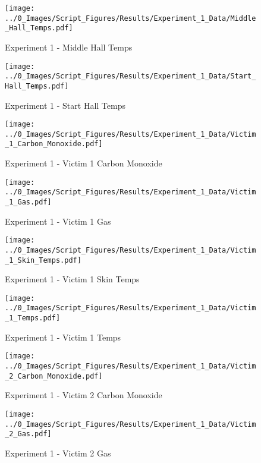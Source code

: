 	\begin{figure}[H]
		\centering
		\texttt{[image: ../0\_Images/Script\_Figures/Results/Experiment\_1\_Data/Middle\_Hall\_Temps.pdf]}
		\caption[]{Experiment 1 - Middle Hall Temps}
	\end{figure}
 
	\clearpage

	\begin{figure}[H]
		\centering
		\texttt{[image: ../0\_Images/Script\_Figures/Results/Experiment\_1\_Data/Start\_Hall\_Temps.pdf]}
		\caption[]{Experiment 1 - Start Hall Temps}
	\end{figure}
 

	\begin{figure}[H]
		\centering
		\texttt{[image: ../0\_Images/Script\_Figures/Results/Experiment\_1\_Data/Victim\_1\_Carbon\_Monoxide.pdf]}
		\caption[]{Experiment 1 - Victim 1 Carbon Monoxide}
	\end{figure}
 
	\clearpage

	\begin{figure}[H]
		\centering
		\texttt{[image: ../0\_Images/Script\_Figures/Results/Experiment\_1\_Data/Victim\_1\_Gas.pdf]}
		\caption[]{Experiment 1 - Victim 1 Gas}
	\end{figure}
 

	\begin{figure}[H]
		\centering
		\texttt{[image: ../0\_Images/Script\_Figures/Results/Experiment\_1\_Data/Victim\_1\_Skin\_Temps.pdf]}
		\caption[]{Experiment 1 - Victim 1 Skin Temps}
	\end{figure}
 
	\clearpage

	\begin{figure}[H]
		\centering
		\texttt{[image: ../0\_Images/Script\_Figures/Results/Experiment\_1\_Data/Victim\_1\_Temps.pdf]}
		\caption[]{Experiment 1 - Victim 1 Temps}
	\end{figure}
 

	\begin{figure}[H]
		\centering
		\texttt{[image: ../0\_Images/Script\_Figures/Results/Experiment\_1\_Data/Victim\_2\_Carbon\_Monoxide.pdf]}
		\caption[]{Experiment 1 - Victim 2 Carbon Monoxide}
	\end{figure}
 
	\clearpage

	\begin{figure}[H]
		\centering
		\texttt{[image: ../0\_Images/Script\_Figures/Results/Experiment\_1\_Data/Victim\_2\_Gas.pdf]}
		\caption[]{Experiment 1 - Victim 2 Gas}
	\end{figure}
 

